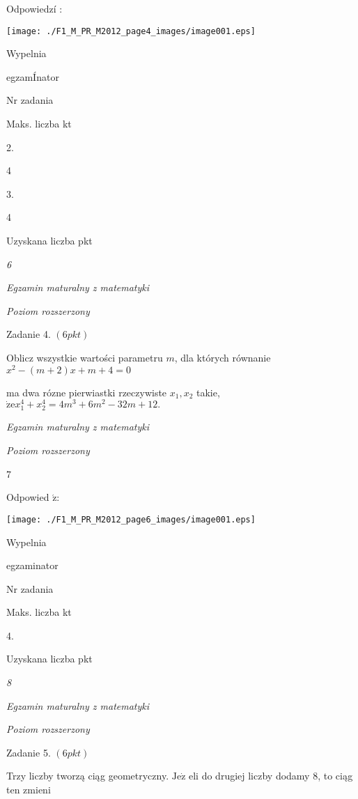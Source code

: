 \documentclass[a4paper,12pt]{article}
\begin{document}
Odpowiedzí :
\begin{center}
\texttt{[image: ./F1\_M\_PR\_M2012\_page4\_images/image001.eps]}
\end{center}
Wypelnia

egzamÍnator

Nr zadania

Maks. liczba kt

2.

4

3.

4

Uzyskana liczba pkt





{\it 6}

{\it Egzamin maturalny z matematyki}

{\it Poziom rozszerzony}

Zadanie 4. $(6pkt)$

Oblicz wszystkie wartości parametru $m$, dla których równanie $x^{2}-(m+2)x+m+4=0$

ma dwa rózne pierwiastki rzeczywiste $x_{1}, x_{2}$ takie, $\dot{\mathrm{z}}\mathrm{e}x_{1}^{4}+x_{2}^{4}=4m^{3}+6m^{2}-32m+12.$





{\it Egzamin maturalny z matematyki}

{\it Poziom rozszerzony}

7

Odpowied $\acute{\mathrm{z}}$:
\begin{center}
\texttt{[image: ./F1\_M\_PR\_M2012\_page6\_images/image001.eps]}
\end{center}
Wypelnia

egzaminator

Nr zadania

Maks. liczba kt

4.

Uzyskana liczba pkt





{\it 8}

{\it Egzamin maturalny z matematyki}

{\it Poziom rozszerzony}

Zadanie 5. $(6pkt)$

Trzy liczby tworzą ciąg geometryczny. $\mathrm{J}\mathrm{e}\dot{\mathrm{z}}$ eli do drugiej liczby dodamy 8, to ciąg ten zmieni
\end{document}
